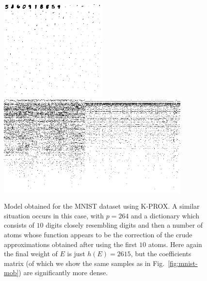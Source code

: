 \documentclass[twocolumn]{IEEEtran}
\theoremstyle{definition}
\begin{document}
\begin{figure}[tp]
\centering\includegraphics[height=2.0in]{fig/mnist_kprox_dict.png}\hspace{2ex}%
\includegraphics[height=2.0in]{fig/mnist_kprox_coef_crop.png}%
\caption{\label{fig:mnist-kprox} Model obtained for the MNIST dataset using K-PROX. A similar situation occurs in this case, with $p=264$ and a dictionary which consists of $10$ digits closely resembling digits and then a number of atoms whose function appears to be the correction of the crude approximations obtained after using the first $10$ atoms. Here again the final weight of $E$ is just $h(E)=2615$, but  the coefficients matrix (of which we show the same samples as in Fig.~\ref{fig:mnist-mob}) are significantly more dense. }
\end{figure}
%
\end{document}
